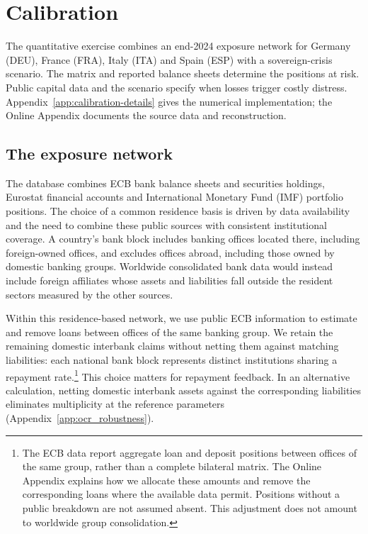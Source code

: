 \section{Calibration}\label{sec:calibration}

The quantitative exercise combines an end-2024 exposure network for Germany (DEU), France (FRA), Italy (ITA) and Spain (ESP) with a sovereign-crisis scenario. The matrix and reported balance sheets determine the positions at risk. Public capital data and the scenario specify when losses trigger costly distress. Appendix~\ref{app:calibration-details} gives the numerical implementation; the Online Appendix documents the source data and reconstruction.

\subsection{The exposure network}

The database combines ECB bank balance sheets and securities holdings, Eurostat financial accounts and International Monetary Fund (IMF) portfolio positions. The choice of a common residence basis is driven by data availability and the need to combine these public sources with consistent institutional coverage. A country's bank block includes banking offices located there, including foreign-owned offices, and excludes offices abroad, including those owned by domestic banking groups. Worldwide consolidated bank data would instead include foreign affiliates whose assets and liabilities fall outside the resident sectors measured by the other sources.

Within this residence-based network, we use public ECB information to estimate and remove loans between offices of the same banking group. We retain the remaining domestic interbank claims without netting them against matching liabilities: each national bank block represents distinct institutions sharing a repayment rate.\footnote{The ECB data report aggregate loan and deposit positions between offices of the same group, rather than a complete bilateral matrix. The Online Appendix explains how we allocate these amounts and remove the corresponding loans where the available data permit. Positions without a public breakdown are not assumed absent. This adjustment does not amount to worldwide group consolidation.} This choice matters for repayment feedback. In an alternative calculation, netting domestic interbank assets against the corresponding liabilities eliminates multiplicity at the reference parameters (Appendix~\ref{app:ocr_robustness}).

